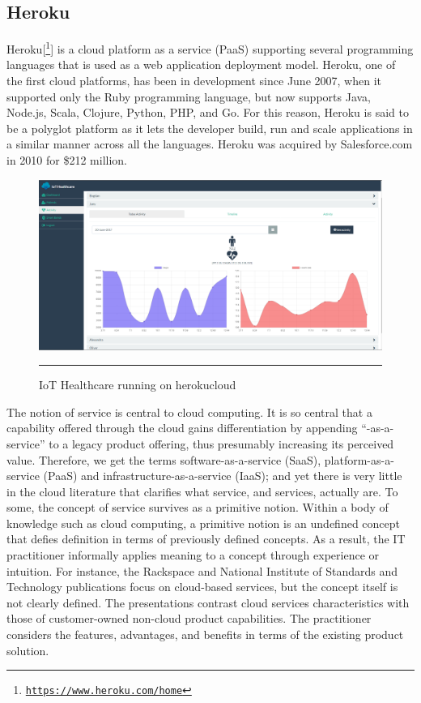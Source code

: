 \subsection{Heroku}
Heroku[\footnote{\href{https://www.heroku.com/home}{\texttt{https://www.heroku.com/home}}}] is a cloud platform as a service (PaaS) supporting several programming languages that is used as a web application deployment model. Heroku, one of the first cloud platforms, has been in development since June 2007, when it supported only the Ruby programming language, but now supports Java, Node.js, Scala, Clojure, Python, PHP, and Go. For this reason, Heroku is said to be a polyglot platform as it lets the developer build, run and scale applications in a similar manner across all the languages. Heroku was acquired by Salesforce.com in 2010 for \$212 million.
\newline
\begin{figure}[h!]
	\centering
	\includegraphics[width=1\textwidth]{./images/iothheroku}
	\rule{1\textwidth}{1pt}
	\caption{IoT Healthcare running on herokucloud}
	\label{fig:iothoh}
\end{figure}
The notion of service is central to cloud computing. It is so central that a capability offered through the cloud gains differentiation by appending “-as-a-service” to a legacy product offering, thus presumably increasing its perceived value. Therefore, we get the terms software-as-a-service (SaaS), platform-as-a-service (PaaS) and infrastructure-as-a-service (IaaS); and yet there is very little in the cloud literature that clarifies what service, and services, actually are. To some, the concept of service survives as a primitive notion. Within a body of knowledge such as cloud computing, a primitive notion is an undefined concept that defies definition in terms of previously defined concepts. As a result, the IT practitioner informally applies meaning to a concept through experience or intuition. For instance, the Rackspace and National Institute of Standards and Technology publications focus on cloud-based services, but the concept itself is not clearly defined. The presentations contrast cloud services characteristics with those of customer-owned non-cloud product capabilities. The practitioner considers the features, advantages, and benefits in terms of the existing product solution.
\newline

